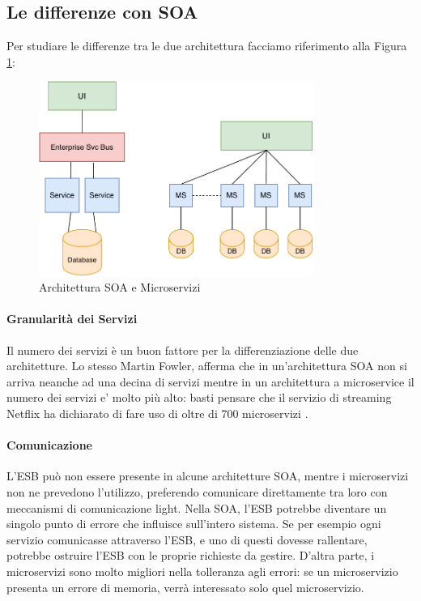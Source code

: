 \subsection{Le differenze con SOA}
Per studiare le differenze tra le due architettura facciamo riferimento alla Figura \ref{fig:soavsmicroservices}:
\begin{figure}[H]
    \centering
    \includegraphics[width=0.80\textwidth]{images/01_8_microservices_vs_soa.pdf}
    \caption{Architettura SOA e Microservizi }
    \label{fig:soavsmicroservices}
\end{figure}
\paragraph*{Granularità dei Servizi} Il numero dei servizi è un buon fattore per la differenziazione delle due architetture. Lo stesso Martin Fowler, afferma che in un'architettura SOA non si arriva neanche ad una decina di  servizi mentre in un architettura a microservice il numero dei servizi e’ molto più alto: basti pensare che il servizio di streaming Netflix ha dichiarato di fare uso di oltre di 700 microservizi \cite{article:netflixmicroservices}.

\paragraph{Comunicazione} L'ESB può non essere presente in alcune architetture SOA, mentre i microservizi non ne prevedono l’utilizzo, preferendo comunicare direttamente tra loro con meccanismi di comunicazione light. Nella SOA, l’ESB potrebbe diventare un singolo punto di errore che influisce sull’intero sistema. Se per esempio ogni servizio comunicasse attraverso l’ESB, e uno di questi dovesse rallentare, potrebbe ostruire l’ESB con le proprie richieste da gestire. D’altra parte, i microservizi sono molto migliori nella tolleranza agli errori: se un microservizio presenta un errore di memoria, verrà interessato solo quel microservizio.

